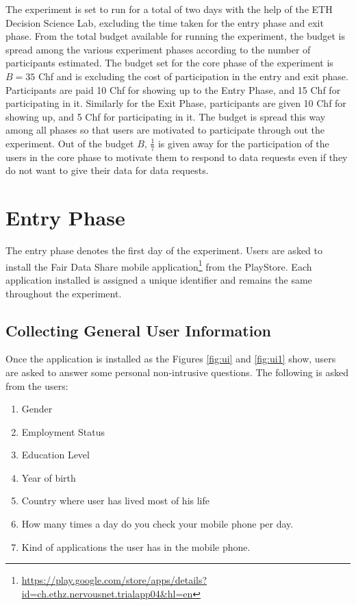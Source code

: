 The experiment is set to run for a total of two days with the help of the ETH Decision Science Lab, excluding the time taken for the entry phase and exit phase. From the total budget available for running the experiment, the budget is spread among the various experiment phases according to the number of participants estimated. The budget set for the core phase of the experiment is $B=35$ Chf and is excluding the cost of participation
in the entry and exit phase. Participants are paid 10 Chf for showing up to the Entry Phase, and 15 Chf for
participating in it. Similarly for the Exit Phase, participants are given 10 Chf for showing up, and 5 Chf for participating in it. The budget is spread this way among all phases so that users are motivated to participate through out the experiment.
Out of the budget $B$, $\frac{1}{7}$ is given away for the participation of the users in the core phase to motivate them to respond to data requests even if they do not want to give their data for data requests. 

\section{Entry Phase}

The entry phase denotes the first day of the experiment. Users are asked to install the Fair Data Share mobile application\footnote{\url{https://play.google.com/store/apps/details?id=ch.ethz.nervousnet.trialapp04&hl=en}} from the PlayStore. Each application installed is assigned a unique identifier and remains the same throughout the experiment. 

\subsection{Collecting General User Information}
Once the application is installed as the Figures \ref{fig:ui} and \ref{fig:ui1} show, users are asked to answer some personal non-intrusive questions. The following is asked from the users: 
\begin{enumerate}
    \item Gender
    \item Employment Status
    \item Education Level
    \item Year of birth
    \item Country where user has lived most of his life
    \item How many times a day do you check your mobile phone per day.
    \item Kind of applications the user has in the mobile phone.
\end{enumerate}

